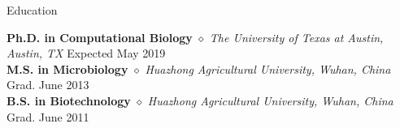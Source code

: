 \documentclass{my_resume} %
\begin{document}
\vspace{-1mm}



\begin{rSection}{Education}

{\bf Ph.D. in Computational Biology} {$\diamond$} {\em The University of
Texas at Austin, Austin, TX} \hfill {Expected May 2019} \\
{\bf M.S. in Microbiology} {$\diamond$} {\em Huazhong Agricultural University,
Wuhan, China} \hfill {Grad. June 2013} \\
{\bf B.S. in Biotechnology} {$\diamond$} {\em Huazhong Agricultural University,
Wuhan, China} \hfill {Grad. June 2011}
\end{rSection}

\end{document}
